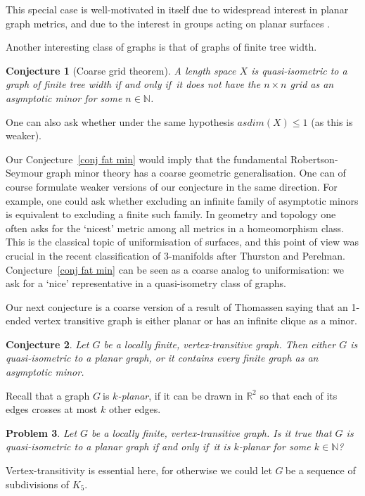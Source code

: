 \documentclass[a4paper]{article}
\newcommand{\defi}[1]{{\color{darkgray}\emph{#1}}}
\newtheorem{conjecture}{{Conjecture}}[section]
\newtheorem{problem}[conjecture]{{Problem}}
\newcommand{\N}{\ensuremath{\mathbb N}}
\newcommand{\R}{\ensuremath{\mathbb R}}
\newcommand{\nin}{\ensuremath{{n\in\N}}}
\newcommand{\g}{\ensuremath{G\ }}
\newcommand{\Cnr}[1]{Con\-jecture~\ref{#1}}
\renewcommand{\iff}{if and only if}
\begin{document}
This special case is well-motivated in itself due to widespread interest in planar graph metrics, and due to the interest in groups acting on planar surfaces \cite{Kleinian}. 

Another interesting class of graphs is that of graphs of finite tree width.

\begin{conjecture}[Coarse grid theorem] \label{con grid}
A length space $X$ is quasi-isometric to a graph of finite tree width \iff\ it does not have the $n\times n$  grid as an   asymptotic minor for some \nin. 
\end{conjecture}
One can also ask whether under the same hypothesis $asdim (X)\leq 1$ (as this is weaker). 

Our \Cnr{conj fat min}  would imply that the fundamental Robertson-Seymour graph minor theory has a coarse geometric generalisation. One can of course formulate weaker versions of our conjecture in the same direction. For example, one could ask whether excluding an infinite family of asymptotic minors is equivalent to excluding a finite such family. In geometry and topology one often asks for the `nicest' metric among all metrics in a homeomorphism class. This is the classical topic of uniformisation of surfaces,
and this point of view was crucial in the recent classification of 3-manifolds after Thurston and Perelman.  \Cnr{conj fat min}  can be seen as a coarse analog to
uniformisation: we ask for a `nice' representative in a quasi-isometry class of graphs.

\medskip

Our next conjecture is a coarse version of a result of Thomassen  \cite{ThoHad} saying that an 1-ended vertex transitive graph is either planar or has an infinite clique as a minor. 

\begin{conjecture} \label{Tho}
Let $G$ be a locally finite, vertex-transitive graph. Then either $G$ is quasi-isometric to a planar graph, or it contains every finite graph as an asymptotic minor.
\end{conjecture}

Recall that a graph \g is \defi{$k$-planar}, if it can be drawn in $\R^2$ so that each of its edges crosses at most $k$ other edges.
\begin{problem} \label{k planar}
Let $G$ be a locally finite, vertex-transitive graph. Is it true that $G$ is quasi-isometric to a planar graph \iff\ it is $k$-planar for some $k\in \N$?
\end{problem}
Vertex-transitivity is essential here, for otherwise we could let \g be a sequence of subdivisions of $K_5$.
\end{document}
